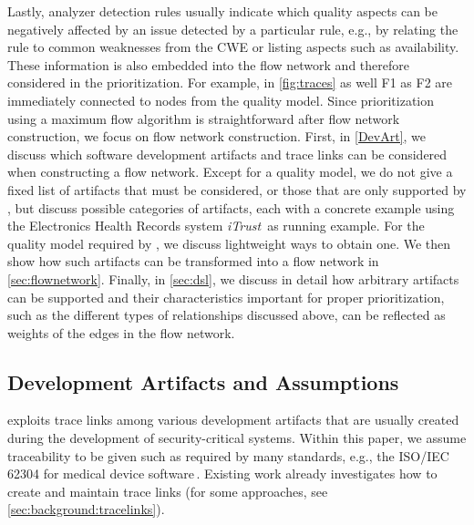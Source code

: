 	 Lastly, analyzer detection rules usually indicate which quality aspects can be negatively affected by an issue detected by a particular rule, e.g., by relating the rule to common weaknesses from the CWE or listing aspects such as availability.
	These information is also embedded into the flow network and therefore considered in the prioritization.
	For example, in \autoref{fig:traces} as well F1 as F2 are immediately connected to nodes from the quality model.
%
%
Since prioritization using a maximum flow algorithm is straightforward after flow network construction, we focus on flow network construction.
First, in \autoref{DevArt}, we discuss which software development artifacts and trace links can be considered when constructing a flow network.
Except for a quality model, we do not give a fixed list of artifacts that must be considered, or those that are only supported by \appr{}, but discuss possible categories of artifacts, each with a concrete example using the Electronics Health Records system \emph{iTrust}\,\cite{iTrust} as running example.
For the quality model required by \appr{}, we discuss lightweight ways to obtain one.
We then show how such artifacts can be transformed into a flow network in \autoref{sec:flownetwork}.
Finally, in \autoref{sec:dsl}, we discuss in detail how arbitrary artifacts can be supported and their characteristics important for proper prioritization, such as the different types of relationships discussed above, can be reflected as weights of the edges in the flow network.

\subsection{Development Artifacts and Assumptions}
\label{DevArt}
%
\appr{} exploits trace links among various development artifacts that are usually created during the development of security-critical systems.
Within this paper, we assume traceability to be given such as required by many standards, e.g., the ISO/IEC 62304 for medical device software\,\cite{IEC62304}.
Existing work already investigates how to create and maintain trace links (for some approaches, see \autoref{sec:background:tracelinks}).

